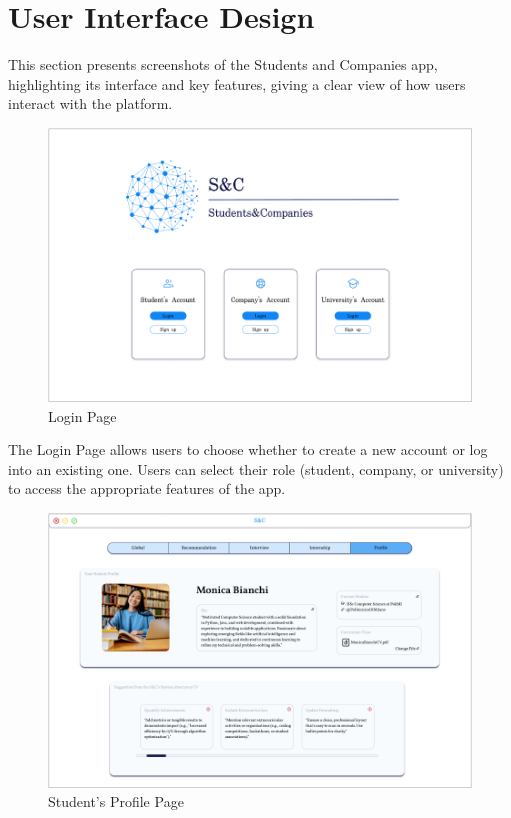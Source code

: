 \chapter{User Interface Design}


This section presents screenshots of the Students and Companies app, highlighting its interface and key features, giving a clear view of how users interact with the platform.

\begin{figure}[H]
    \centering
    \includegraphics[width=1\linewidth]{DD//Images/UI photos/Home.png}
    \caption{Login Page}
\end{figure}

The Login Page allows users to choose whether to create a new account or log into an existing one. Users can select their role (student, company, or university) to access the appropriate features of the app.

\begin{figure}[H]
    \centering
    \includegraphics[width=1\linewidth]{DD//Images/UI photos/Student's Profile.png}
    \caption{Student's Profile Page}
\end{figure}

